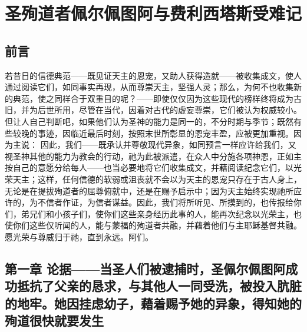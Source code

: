 
\chapter{圣殉道者佩尔佩图阿与费利西塔斯受难记}



\section{前言}

若昔日的信德典范——既见证天主的恩宠，又助人获得造就——被收集成文，使人通过阅读它们，如同事实再现，从而尊崇天主，坚强人灵；那么，为何不也收集新的典范，使之同样合于双重目的呢？——即使仅仅因为这些现代的榜样终将成为古旧，并为后世所用，尽管在当代，因着对古代的虚妄尊崇，它们被认为权威较小。但让人自己判断吧，如果他们认为圣神的能力是同一的，不分时期与季节；既然有些较晚的事迹，因临近最后时刻，按照末世所彰显的恩宠丰盈，应被更加重视。因为主说： 因此，我们——既承认并尊敬现代异象，如同预言一样应许给我们，又视圣神其他的能力为教会的行动，祂为此被派遣，在众人中分施各项神恩，正如主按自己的意愿分给每人——也当必要地将它们收集成文，并藉阅读纪念它们，以光荣天主；这样，任何信德的软弱或沮丧就不会以为天主的恩宠只存在于古人身上，无论是在提拔殉道者的屈尊俯就中，还是在赐予启示中；因为天主始终实现祂所应许的，为不信者作证，为信者谋益。因此，我们将所听见、所摸到的，也传报给你们，弟兄们和小孩子们，使你们这些亲身经历此事的人，能再次纪念以光荣主，也使你们这些仅听闻的人，能与蒙福的殉道者共融，并藉着他们与主耶稣基督共融。愿光荣与尊威归于祂，直到永远。阿们。\par


\section{第一章 论据——当圣人们被逮捕时，圣佩尔佩图阿成功抵抗了父亲的恳求，与其他人一同受洗，被投入肮脏的地牢。她因挂虑幼子，藉着赐予她的异象，得知她的殉道很快就要发生}

